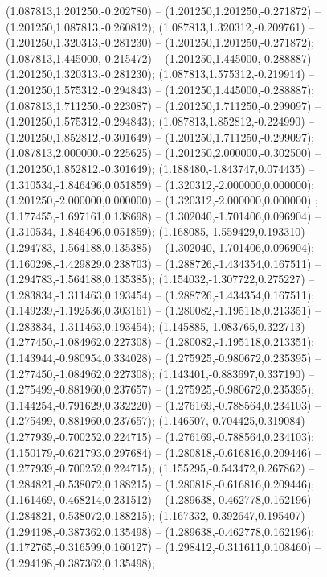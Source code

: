  (1.087813,1.201250,-0.202780) -- (1.201250,1.201250,-0.271872) -- (1.201250,1.087813,-0.260812);
 (1.087813,1.320312,-0.209761) -- (1.201250,1.320313,-0.281230) -- (1.201250,1.201250,-0.271872);
 (1.087813,1.445000,-0.215472) -- (1.201250,1.445000,-0.288887) -- (1.201250,1.320313,-0.281230);
 (1.087813,1.575312,-0.219914) -- (1.201250,1.575312,-0.294843) -- (1.201250,1.445000,-0.288887);
 (1.087813,1.711250,-0.223087) -- (1.201250,1.711250,-0.299097) -- (1.201250,1.575312,-0.294843);
 (1.087813,1.852812,-0.224990) -- (1.201250,1.852812,-0.301649) -- (1.201250,1.711250,-0.299097);
 (1.087813,2.000000,-0.225625) -- (1.201250,2.000000,-0.302500) -- (1.201250,1.852812,-0.301649);
 (1.188480,-1.843747,0.074435) -- (1.310534,-1.846496,0.051859) -- (1.320312,-2.000000,0.000000);
 (1.201250,-2.000000,0.000000) -- (1.320312,-2.000000,0.000000) ;
 (1.177455,-1.697161,0.138698) -- (1.302040,-1.701406,0.096904) -- (1.310534,-1.846496,0.051859);
 (1.168085,-1.559429,0.193310) -- (1.294783,-1.564188,0.135385) -- (1.302040,-1.701406,0.096904);
 (1.160298,-1.429829,0.238703) -- (1.288726,-1.434354,0.167511) -- (1.294783,-1.564188,0.135385);
 (1.154032,-1.307722,0.275227) -- (1.283834,-1.311463,0.193454) -- (1.288726,-1.434354,0.167511);
 (1.149239,-1.192536,0.303161) -- (1.280082,-1.195118,0.213351) -- (1.283834,-1.311463,0.193454);
 (1.145885,-1.083765,0.322713) -- (1.277450,-1.084962,0.227308) -- (1.280082,-1.195118,0.213351);
 (1.143944,-0.980954,0.334028) -- (1.275925,-0.980672,0.235395) -- (1.277450,-1.084962,0.227308);
 (1.143401,-0.883697,0.337190) -- (1.275499,-0.881960,0.237657) -- (1.275925,-0.980672,0.235395);
 (1.144254,-0.791629,0.332220) -- (1.276169,-0.788564,0.234103) -- (1.275499,-0.881960,0.237657);
 (1.146507,-0.704425,0.319084) -- (1.277939,-0.700252,0.224715) -- (1.276169,-0.788564,0.234103);
 (1.150179,-0.621793,0.297684) -- (1.280818,-0.616816,0.209446) -- (1.277939,-0.700252,0.224715);
 (1.155295,-0.543472,0.267862) -- (1.284821,-0.538072,0.188215) -- (1.280818,-0.616816,0.209446);
 (1.161469,-0.468214,0.231512) -- (1.289638,-0.462778,0.162196) -- (1.284821,-0.538072,0.188215);
 (1.167332,-0.392647,0.195407) -- (1.294198,-0.387362,0.135498) -- (1.289638,-0.462778,0.162196);
 (1.172765,-0.316599,0.160127) -- (1.298412,-0.311611,0.108460) -- (1.294198,-0.387362,0.135498);
